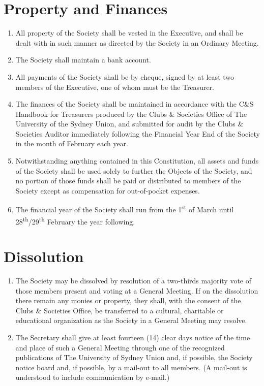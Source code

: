 \documentclass[11pt]{article}
\begin{document}
\section{Property and Finances}
\begin{enumerate}[\thesection .1]
    \item All property of the Society shall be vested in the Executive, and shall be dealt with in such manner as directed by the Society in an Ordinary Meeting.
    \item The Society shall maintain a bank account.
    \item All payments of the Society shall be by cheque, signed by at least two members of the Executive, one of whom must be the Treasurer.
    \item The finances of the Society shall be maintained in accordance with the C\&S Handbook for Treasurers produced by the Clubs \& Societies Office of The University of the Sydney Union, and submitted for audit by the Clubs \& Societies Auditor immediately following the Financial Year End of the Society in the month of February each year.
    \item Notwithstanding anything contained in this Constitution, all assets and funds of the Society shall be used solely to further the Objects of the Society, and no portion of those funds shall be paid or distributed to members of the Society except as compensation for out-of-pocket expenses.
    \item The financial year of the Society shall run from the 1\textsuperscript{st} of March until 28\textsuperscript{th}/29\textsuperscript{th} February the year following.	
\end{enumerate}


\section{Dissolution}
\begin{enumerate}[\thesection .1]
    \item The Society may be dissolved by resolution of a two-thirds majority vote of those members present and voting at a General Meeting. If on the dissolution there remain any monies or property, they shall, with the consent of the Clubs \& Societies Office, be transferred to a cultural, charitable or educational organization as the Society in a General Meeting may resolve.
    \item The Secretary shall give at least fourteen (14) clear days notice of the time and place of such a General Meeting through one of the recognized publications of The University of Sydney Union and, if possible, the Society notice board and, if possible, by a mail-out to all members. (A mail-out is understood to include communication by e-mail.)
\end{enumerate}
\end{document}
